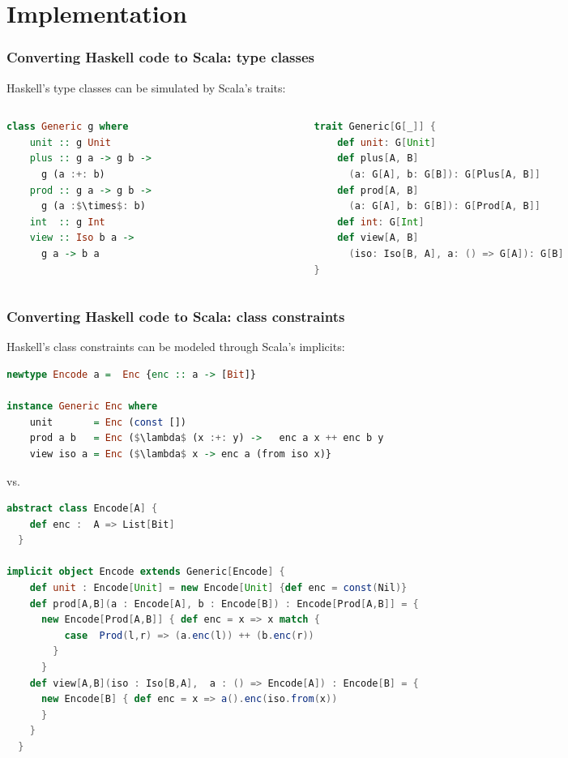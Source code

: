 \documentclass[10pt]{beamer}
\begin{document}
\section{Implementation}
\begin{frame}[fragile]
\frametitle{Converting Haskell code to Scala: type classes}
Haskell's type classes can be simulated by Scala's traits:

\begin{columns}
\begin{column}{.35\textwidth}
\begin{lstlisting}[language=Haskell,basicstyle=\ttfamily\scriptsize,mathescape]
class Generic g where
    unit :: g Unit
    plus :: g a -> g b -> 
      g (a :+: b)
    prod :: g a -> g b -> 
      g (a :$\times$: b)
    int  :: g Int
    view :: Iso b a -> 
      g a -> b a
\end{lstlisting}
\end{column}
\begin{column}{.60\textwidth}
\begin{lstlisting}[language=Scala,basicstyle=\ttfamily\scriptsize,mathescape]
trait Generic[G[_]] {
    def unit: G[Unit]
    def plus[A, B]
      (a: G[A], b: G[B]): G[Plus[A, B]]
    def prod[A, B]
      (a: G[A], b: G[B]): G[Prod[A, B]]
    def int: G[Int]
    def view[A, B]
      (iso: Iso[B, A], a: () => G[A]): G[B]
}
\end{lstlisting}  
\end{column}  
\end{columns}
\end{frame}

\begin{frame}[fragile]
\frametitle{Converting Haskell code to Scala: class constraints}
Haskell's class constraints can be modeled through Scala's implicits:

\begin{lstlisting}[language=Haskell,basicstyle=\ttfamily\scriptsize,mathescape]
newtype Encode a =  Enc {enc :: a -> [Bit]}

instance Generic Enc where
    unit       = Enc (const [])          
    prod a b   = Enc ($\lambda$ (x :+: y) ->   enc a x ++ enc b y    
    view iso a = Enc ($\lambda$ x -> enc a (from iso x)}
\end{lstlisting}
\vspace{-10pt}vs.
\begin{lstlisting}[language=Scala,basicstyle=\ttfamily\scriptsize,mathescape]
abstract class Encode[A] {
    def enc :  A => List[Bit]
  }
 
implicit object Encode extends Generic[Encode] {
    def unit : Encode[Unit] = new Encode[Unit] {def enc = const(Nil)}
    def prod[A,B](a : Encode[A], b : Encode[B]) : Encode[Prod[A,B]] = {
      new Encode[Prod[A,B]] { def enc = x => x match {
          case  Prod(l,r) => (a.enc(l)) ++ (b.enc(r))
        }
      }
    def view[A,B](iso : Iso[B,A],  a : () => Encode[A]) : Encode[B] = {
      new Encode[B] { def enc = x => a().enc(iso.from(x))
      }
    }
  }

\end{lstlisting}  
\end{frame}
\end{document}
